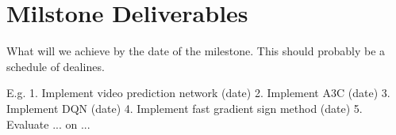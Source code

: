 \section{Milstone Deliverables}

What will we achieve by the date of the milestone.
This should probably be a schedule of dealines.

E.g.
1. Implement video prediction network (date)
2. Implement A3C (date)
3. Implement DQN (date)
4. Implement fast gradient sign method (date)
5. Evaluate ... on ...
